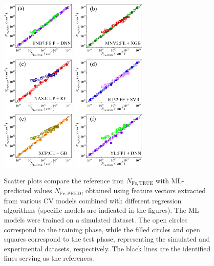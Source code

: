 \documentclass[10pt]{iopart}
\begin{document}
\begin{figure}
\includegraphics[width=0.33\textwidth]{Fig4a}
\includegraphics[width=0.33\textwidth]{Fig4b}
\includegraphics[width=0.33\textwidth]{Fig4c}
\includegraphics[width=0.33\textwidth]{Fig4d}
\includegraphics[width=0.33\textwidth]{Fig4e}
\includegraphics[width=0.33\textwidth]{Fig4f}
\caption{
Scatter plots compare the reference iron $N_\mathrm{Fe,TRUE}$ with ML-predicted values $N_\mathrm{Fe,PRED}$,
obtained using feature vectors extracted from various CV models combined with different regression algorithms
(specific models are indicated in the figures).
The ML models were trained on a simulated dataset.
The open circles correspond to the training phase,
while the filled circles and open squares correspond to the test phase, representing the simulated and experimental datasets, respectively.
The black lines are the identified lines serving as the references.
}\label{Fig4}
\end{figure}
\end{document}
